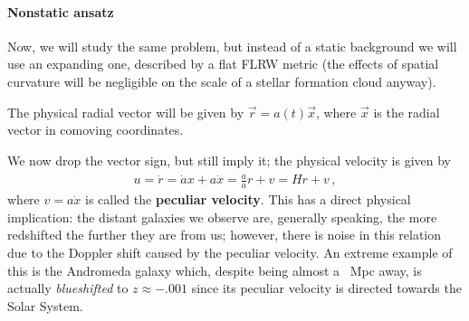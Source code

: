 \documentclass[main.tex]{subfiles}
\begin{document}
\paragraph{Nonstatic ansatz}

Now, we will study the same problem, but instead of a static background we will use an expanding one, described by a flat FLRW metric (the effects of spatial curvature will be negligible on the scale of a stellar formation cloud anyway).



The physical radial vector will be given by \(\vec{r} = a(t) \vec{x}\), where \(\vec{x}\) is the radial vector in comoving coordinates.

We now drop the vector sign, but still imply it; the physical velocity is given by 
%
\begin{align}
  u = \dot{r} = \dot{a} x + a \dot{x} 
  = \frac{\dot{a}}{a} r + v = H r + v
\,,
\end{align}
%
where \(v = a \dot{x}\) is called the \textbf{peculiar velocity}.
This has a direct physical implication: the distant galaxies we observe are, generally speaking, the more redshifted the further they are from us; however, there is noise in this relation due to the Doppler shift caused by the peculiar velocity.
An extreme example of this is the Andromeda galaxy which, despite being almost a \SI{}{Mpc} away, is actually \emph{blueshifted} to \(z \approx \num{-.001}\) since its peculiar velocity is directed towards the Solar System. 
\end{document}
